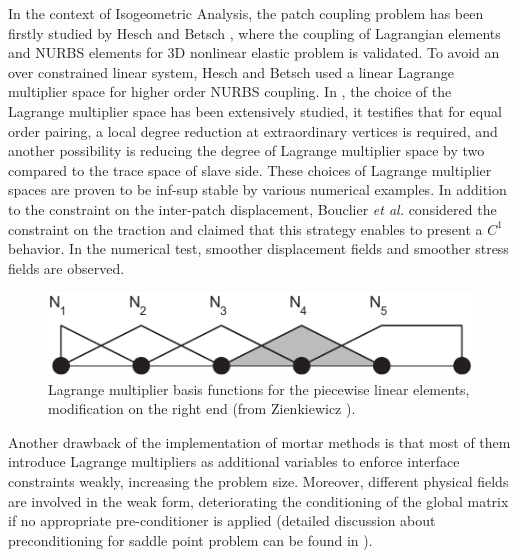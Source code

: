 \documentclass[preprint,12pt]{elsarticle}
\begin{document}
In the context of Isogeometric Analysis, the patch coupling problem has been firstly studied by Hesch and Betsch \cite{hesch_isogeometric_2012}, where the coupling of Lagrangian elements and NURBS elements for 3D nonlinear elastic problem is validated. To avoid an over constrained linear system, Hesch and Betsch used a linear Lagrange multiplier space for higher order NURBS coupling. In \cite{brivadis_isogeometric_2015}, the choice of the Lagrange multiplier space has been extensively studied, it testifies that for equal order pairing, a local degree reduction at extraordinary vertices is required, and another possibility is reducing the degree of Lagrange multiplier space  by two compared to the trace space of slave side. These choices of Lagrange multiplier spaces are proven to be inf-sup stable by various numerical examples. In addition to the constraint on the inter-patch displacement, Bouclier \textit{et al.} \cite{bouclier_development_2017} considered the constraint on the traction and claimed that this strategy enables to present a $C^1$ behavior. In the numerical test, smoother displacement fields and smoother stress fields are observed. \par
\begin{figure}
    \centering
    \includegraphics[width=.7\linewidth]{mortar_basis}
    \caption{Lagrange multiplier basis functions for the piecewise linear elements, modification on the right end (from Zienkiewicz \cite{zienkiewicz1977finite}).}\label{fig:mortar_basis}
\end{figure}
Another drawback of the implementation of mortar methods is that most of them introduce Lagrange multipliers as additional variables to enforce interface constraints weakly, increasing the problem size. Moreover, different physical fields are involved in the weak form, deteriorating the conditioning of the global matrix if no appropriate pre-conditioner is applied (detailed discussion about preconditioning for saddle point problem can be found in \cite{farhat_scalable_1995,benzi_preconditioning_2008,tezaur_analysis_1998}).\par
\end{document}
